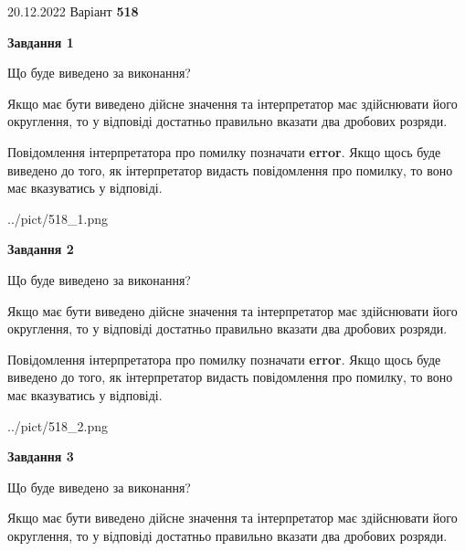 \documentclass[12pt, ukrainian]{article}
\begin{document}
{20.12.2022 Варіант \No \textbf { 518 }\par}
{
\begin {Large}

{\begin {center}\textbf{Завдання 1}\end {center}}\par
Що буде виведено за виконання? \par

Якщо має бути виведено дійсне значення та інтерпретатор має здійснювати його округлення, 
то у відповіді достатньо правильно вказати два дробових розряди.

Повідомлення інтерпретатора про помилку позначати \textbf{error}.
Якщо щось буде виведено до того, як інтерпретатор видасть повідомлення про помилку, 
то воно має вказуватись у відповіді. \par

\begin{center}
	{../pict/518_1.png}
\end{center}
\newpage

{\begin {center}\textbf{Завдання 2}\end {center}}\par
Що буде виведено за виконання? \par

Якщо має бути виведено дійсне значення та інтерпретатор має здійснювати його округлення, 
то у відповіді достатньо правильно вказати два дробових розряди.

Повідомлення інтерпретатора про помилку позначати \textbf{error}.
Якщо щось буде виведено до того, як інтерпретатор видасть повідомлення про помилку, 
то воно має вказуватись у відповіді. \par

\begin{center}
	{../pict/518_2.png}
\end{center}
\newpage

{\begin {center}\textbf{Завдання 3}\end {center}}\par
Що буде виведено за виконання? \par

Якщо має бути виведено дійсне значення та інтерпретатор має здійснювати його округлення, 
то у відповіді достатньо правильно вказати два дробових розряди.


\end{Large}}
\end{document}
